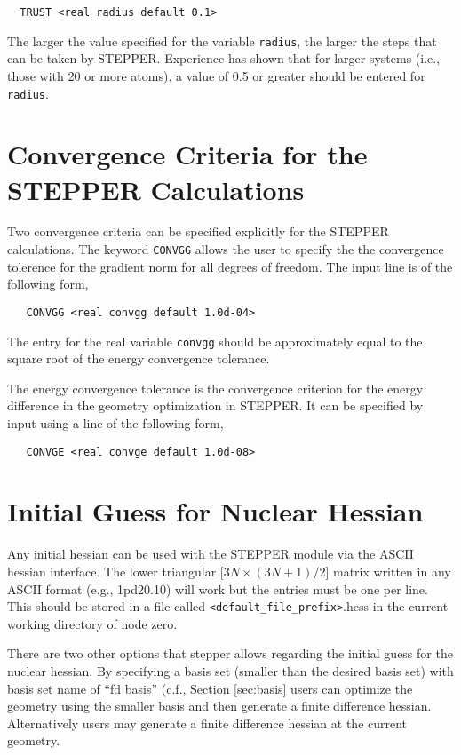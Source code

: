 \begin{verbatim}
  TRUST <real radius default 0.1>
\end{verbatim}

The larger the value specified for the variable \verb+radius+, the larger 
the steps that can be taken by STEPPER. Experience has shown that for
larger systems (i.e., those with 20 or more atoms), a value of 0.5 or
greater should be entered for \verb+radius+.

\section{Convergence Criteria for the STEPPER Calculations}

Two convergence criteria can be specified explicitly for the 
STEPPER calculations.  The keyword \verb+CONVGG+ allows the user to
specify the the convergence tolerence for the gradient norm for
all degrees of freedom.  The input line is of the following form,

\begin{verbatim}
   CONVGG <real convgg default 1.0d-04>
\end{verbatim}

The entry for the real variable \verb+convgg+ should be approximately 
equal to the square root of the energy convergence tolerance.

The energy convergence tolerance is the convergence criterion for the 
energy difference in the geometry optimization in STEPPER.  It can be
specified by input using a line of the following form,

\begin{verbatim}
   CONVGE <real convge default 1.0d-08>
\end{verbatim}


\section{Initial Guess for Nuclear Hessian}

Any initial hessian can be used with the STEPPER module via the ASCII
hessian interface.  The lower triangular [$3N{\times}(3N+1)/2$] matrix
written in any ASCII format (e.g., 1pd20.10) will work but the entries
must be one per line.  This should be stored in a file called
\verb+<default_file_prefix>+.hess in the current working directory of
node zero.  

There are two other options that stepper allows regarding the initial
guess for the nuclear hessian.  By specifying a basis set (smaller
than the desired basis set) with basis set name of ``fd basis'' (c.f.,
Section \ref{sec:basis} users can optimize the geometry using the
smaller basis and then generate a finite difference hessian.
Alternatively users may generate a finite difference hessian at the
current geometry.  

